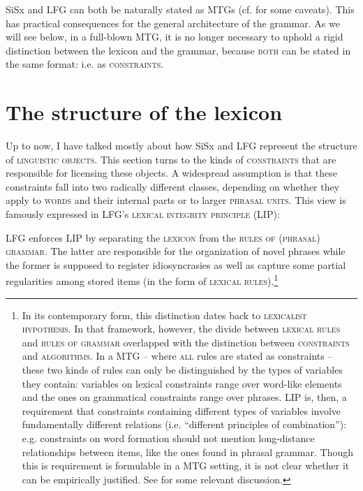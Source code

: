 \documentclass[output=paper,hidelinks]{langscibook}
\begin{document}
SiSx and LFG can both be naturally stated as MTGs (cf. \citealt{blackburn1995a-specification, pullum2019what} for some caveats). This has practical consequences for the general architecture of the grammar. As we will see below, in a full-blown MTG, it is no longer necessary to uphold a rigid distinction between the lexicon and the grammar, because \textsc{both} can be stated in the same format: i.e. as \textsc{constraints}. 





\section{The structure of the lexicon}\label{ss:sec4}


Up to now, I have talked mostly about how SiSx and LFG represent the structure of \textsc{linguistic objects}. This section turns to the kinds of \textsc{constraints} that are responsible for licensing these objects. A widespread assumption is that these constraints fall into two radically different classes, depending on whether they apply to \textsc{words} and their internal parts or to larger \textsc{phrasal units}. This view is famously expressed in LFG's \textsc{lexical integrity principle} (LIP):

\begin{exe}
\end{exe}


LFG enforces LIP by separating the \textsc{lexicon} from the \textsc{rules of (phrasal) grammar}. The latter are responsible for the organization of novel phrases while the former is supposed to register idiosyncrasies as well as capture some partial regularities among stored items (in the form of \textsc{lexical rules}).\footnote{In its contemporary form, this distinction dates back to  \textsc{lexicalist hypothesis}. In that framework, however, the divide between \textsc{lexical rules} and \textsc{rules of grammar} overlapped with the distinction between \textsc{constraints} and \textsc{algorithms}. In a MTG -- where \textsc{all} rules are stated as constraints --  these two kinds of rules can only be distinguished by the types of variables they contain: variables on lexical constraints  range over word-like elements and the ones on grammatical constraints range over phrases. LIP is, then, a requirement that constraints containing different types of variables involve fundamentally different relations (i.e. ``different principles of combination''): e.g. constraints on word formation should not mention long-distance relationships between items, like the ones found in phrasal grammar. Though this is requirement is formulable in a MTG setting, it is not clear whether it can be empirically justified. See \citet{bruening2018lexicalist} for some relevant discussion.} %
\end{document}
